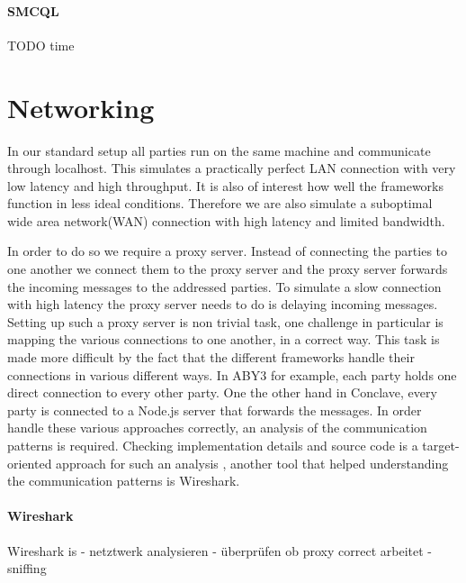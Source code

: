 \paragraph{SMCQL}
TODO time \cite{time_sh}
 
\section{Networking}
In our standard setup all parties run on the same machine and communicate through localhost. This simulates a practically perfect LAN connection with very low latency and high throughput. It is also of interest how well the frameworks function in less ideal conditions. Therefore we are also simulate a suboptimal wide area network(WAN) connection with high latency and limited bandwidth.

In order to do so we require a proxy server. Instead of connecting the parties to one another we connect them to the proxy server and the proxy server forwards the incoming messages to the addressed parties. To simulate a slow connection with high latency the proxy server needs to do is delaying incoming messages. Setting up such a proxy server is non trivial task, one challenge in particular is mapping the various connections to one another, in a correct way. This task is made more difficult by the fact that the different frameworks handle their connections in various different ways. In ABY3 for example, each party holds one direct connection to every other party. One the other hand in Conclave, every party is connected to a Node.js server that forwards the messages. In order handle these various approaches correctly, an analysis of the communication patterns is required. Checking implementation details and source code is a target-oriented approach for such an analysis , another tool that helped understanding the communication patterns is Wireshark.      
\paragraph{Wireshark}
Wireshark \cite{wireshark}  is      
- netztwerk analysieren
- überprüfen ob proxy correct arbeitet
- sniffing
